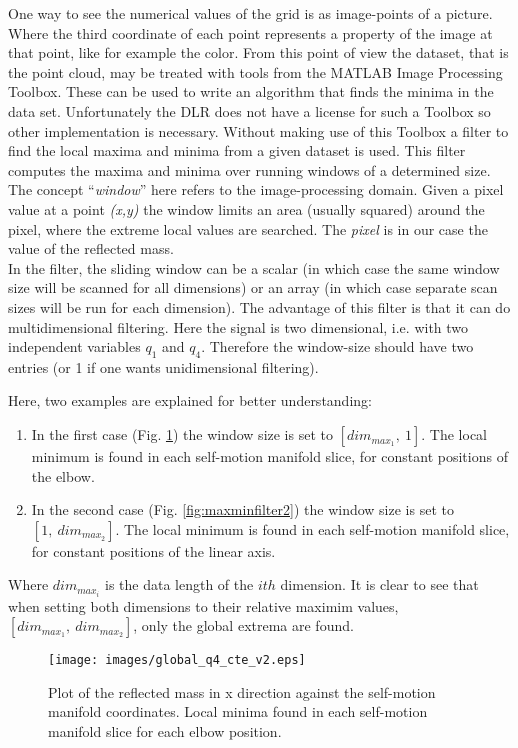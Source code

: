 %
One way to see the numerical values of the grid is as image-points of a picture. Where the third coordinate of each point represents a property of the image at that point, like for example the color. From this point of view the dataset, that is the point cloud, may be treated with tools from the MATLAB Image Processing Toolbox. These can be used to write an algorithm that finds the minima in the data set. Unfortunately the DLR does not have a license for such a Toolbox so other implementation is necessary.
Without making use of this Toolbox a filter \cite{minmaxfilter} to find the local maxima and minima from a given dataset is used. This filter computes the maxima and minima over running windows of a determined size. The concept “\textit{window}” here refers to the image-processing domain. Given a pixel value at a point \textit{(x,y)} the window limits an area (usually squared) around the pixel, where the extreme local values are searched. The \textit{pixel} is in our case  the value of the reflected mass.\\
%
In the filter, the sliding window can be a scalar (in which case the same window size will be scanned for all dimensions) or an array (in which case separate scan sizes will be run for each dimension). The advantage of this filter is that it can do multidimensional filtering. Here the signal is two dimensional, i.e. with two independent variables $q_1$ and $q_4$. Therefore the window-size should have two entries (or 1 if one wants unidimensional filtering).


Here, two examples are explained for better understanding:
\begin{enumerate}
	\item In the first case (Fig. \ref{fig:maxminfilter1}) the window size is set to $[dim_{max_{1}}, \ 1]$. The local minimum is found in each self-motion manifold slice, for constant positions of the elbow.
	\item In the second case (Fig. \ref{fig:maxminfilter2}) the window size is set to $[1, \ dim_{max_{2}}]$. The local minimum is found in each self-motion manifold slice, for constant positions of the linear axis.
	
\end{enumerate}

Where $dim_{max_{i}}$ is the data length of the $ith$ dimension. It is clear to see that when setting both dimensions to their relative maximim values, $[dim_{max_{1}}, \ dim_{max_{2}}]$, only the global extrema are found.


\begin{figure}[htb]
	\centerline{
		\texttt{[image: images/global\_q4\_cte\_v2.eps]}}
	\caption{Plot of the reflected mass in x direction against the self-motion
		manifold coordinates. Local minima found in each self-motion manifold slice for each elbow position. }
	\label{fig:maxminfilter1}
\end{figure}

